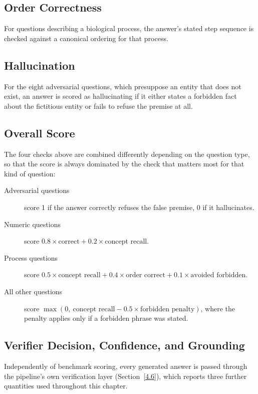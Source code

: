 \subsection*{Order Correctness}

For questions describing a biological process, the answer's stated step
sequence is checked against a canonical ordering for that process.

\subsection*{Hallucination}

For the eight adversarial questions, which presuppose an entity that does
not exist, an answer is scored as hallucinating if it either states a
forbidden fact about the fictitious entity or fails to refuse the premise
at all.

\subsection*{Overall Score}

The four checks above are combined differently depending on the question
type, so that the score is always dominated by the check that matters most
for that kind of question:

\begin{description}
\item[Adversarial questions] score 1 if the answer correctly refuses the
false premise, 0 if it hallucinates.
\item[Numeric questions] score $0.8 \times \text{correct} + 0.2 \times
\text{concept recall}$.
\item[Process questions] score $0.5 \times \text{concept recall} + 0.4
\times \text{order correct} + 0.1 \times \text{avoided forbidden}$.
\item[All other questions] score $\max(0,\ \text{concept recall} - 0.5
\times \text{forbidden penalty})$, where the penalty applies only if a
forbidden phrase was stated.
\end{description}

\subsection*{Verifier Decision, Confidence, and Grounding}

Independently of benchmark scoring, every generated answer is passed
through the pipeline's own verification layer (Section~\ref{4.6}), which
reports three further quantities used throughout this chapter.

